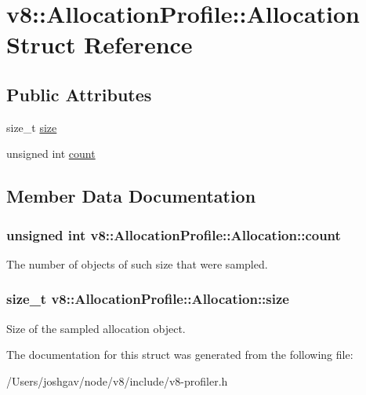 \hypertarget{structv8_1_1_allocation_profile_1_1_allocation}{}\section{v8\+:\+:Allocation\+Profile\+:\+:Allocation Struct Reference}
\label{structv8_1_1_allocation_profile_1_1_allocation}
\subsection*{Public Attributes}
\begin{DoxyCompactItemize}
\item 
size\+\_\+t \hyperlink{structv8_1_1_allocation_profile_1_1_allocation_a346410fa5dfb796dff396069897c0aba}{size}
\item 
unsigned int \hyperlink{structv8_1_1_allocation_profile_1_1_allocation_a012fe5238f5ebec039d7832f2d3ae8ed}{count}
\end{DoxyCompactItemize}


\subsection{Member Data Documentation}
\subsubsection[{\texorpdfstring{count}{count}}]{\setlength{\rightskip}{0pt plus 5cm}unsigned int v8\+::\+Allocation\+Profile\+::\+Allocation\+::count}\hypertarget{structv8_1_1_allocation_profile_1_1_allocation_a012fe5238f5ebec039d7832f2d3ae8ed}{}\label{structv8_1_1_allocation_profile_1_1_allocation_a012fe5238f5ebec039d7832f2d3ae8ed}
The number of objects of such size that were sampled. 
\subsubsection[{\texorpdfstring{size}{size}}]{\setlength{\rightskip}{0pt plus 5cm}size\+\_\+t v8\+::\+Allocation\+Profile\+::\+Allocation\+::size}\hypertarget{structv8_1_1_allocation_profile_1_1_allocation_a346410fa5dfb796dff396069897c0aba}{}\label{structv8_1_1_allocation_profile_1_1_allocation_a346410fa5dfb796dff396069897c0aba}
Size of the sampled allocation object. 

The documentation for this struct was generated from the following file\+:\begin{DoxyCompactItemize}
\item 
/\+Users/joshgav/node/v8/include/v8-\/profiler.\+h\end{DoxyCompactItemize}
